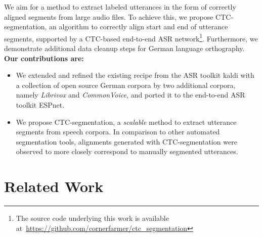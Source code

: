 \documentclass[runningheads]{llncs}
\begin{document}
We aim for a method to extract labeled utterances in the form of correctly aligned segments from large audio files.
To achieve this, we propose CTC-segmentation, an algorithm to correctly align start and end of utterance segments, supported by a CTC-based end-to-end ASR network\footnote{The source code underlying this work is available at~\url{https://github.com/cornerfarmer/ctc_segmentation}}.
Furthermore, we demonstrate additional data cleanup steps for German language orthography.
\textbf{Our contributions are:}
\begin{itemize}
    \item We extended and refined the existing recipe from the ASR toolkit kaldi with a collection of open source German corpora by two additional corpora, namely \emph{Librivox} and \emph{CommonVoice},
    and ported it to the end-to-end ASR toolkit ESPnet.
    \item We propose CTC-segmentation, a \emph{scalable} method to extract utterance segments from speech corpora.
    In comparison to other automated segmentation tools, alignments generated with CTC-segmentation were observed to more closely correspond to manually segmented utterances.
\end{itemize}



\section{Related Work}
\end{document}
